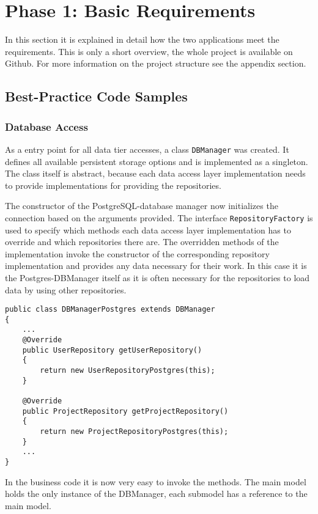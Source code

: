 \section{Phase 1: Basic Requirements}
\label{sec:code-samples}
In this section it is explained in detail how the two applications meet the requirements. This is only a short overview, the whole project is available on Github. For more information on the project structure see the appendix section.

\subsection{Best-Practice Code Samples}

\subsubsection{Database Access}
As a entry point for all data tier accesses, a class \texttt{DBManager} was created. It defines all available persistent storage options and is implemented as a singleton. The class itself is abstract, because each data access layer implementation needs to provide implementations for providing the repositories.


The constructor of the PostgreSQL-database manager now initializes the connection based on the arguments provided. The interface \texttt{RepositoryFactory} is used to specify which methods each data access layer implementation has to override and which repositories there are. The overridden methods of the implementation invoke the constructor of the corresponding repository implementation and provides any data necessary for their work. In this case it is the Postgres-DBManager itself as it is often necessary for the repositories to load data by using other repositories.

\begin{lstlisting}
public class DBManagerPostgres extends DBManager
{
	...
	@Override
	public UserRepository getUserRepository()
	{
		return new UserRepositoryPostgres(this);
	}
	
	@Override
	public ProjectRepository getProjectRepository()
	{
		return new ProjectRepositoryPostgres(this);
	}
	...
}

\end{lstlisting}

In the business code it is now very easy to invoke the methods. The main model holds the only instance of the DBManager, each submodel has a reference to the main model. 

